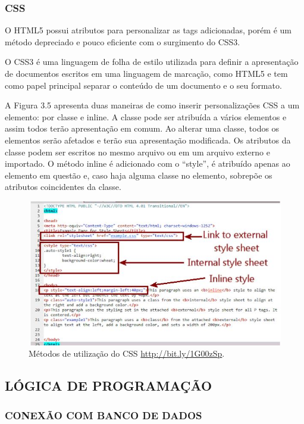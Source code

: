 \documentclass[
  12pt,				%
  openany,
  oneside,
  a4paper,			%
  english,			%
  brazil
]{article}
\numberwithin{figure}{section}
\numberwithin{table}{section}
\begin{document}
\subsubsection{CSS}

O HTML5 possui atributos para personalizar as tags adicionadas, porém é um método depreciado e pouco eficiente com o surgimento do CSS3.

O CSS3 é uma linguagem de folha de estilo utilizada para definir a apresentação de documentos escritos em uma linguagem de marcação, como HTML5 e tem como papel principal separar o conteúdo de um documento e o seu formato.

A Figura 3.5 apresenta duas maneiras de como inserir personalizações CSS a um elemento: por classe e inline. A classe pode ser atribuída a vários elementos e assim todos terão apresentação em comum. Ao alterar uma classe, todos os elementos serão afetados e terão sua apresentação modificada. Os atributos da classe podem ser escritos no mesmo arquivo ou em um arquivo externo e importado. O método inline é adicionado com o “style”, é atribuído apenas ao elemento em questão e, caso haja alguma classe no elemento, sobrepõe os atributos coincidentes da classe.

\begin{figure}[!htb]
\centering
\includegraphics[width=1\textwidth]{figura35}
\caption{Métodos de utilização do CSS \url{http://bit.ly/1G00zSp}.}
\end{figure}


\subsection{LÓGICA DE PROGRAMAÇÃO}
\subsubsection{CONEXÃO COM BANCO DE DADOS}
\end{document}
